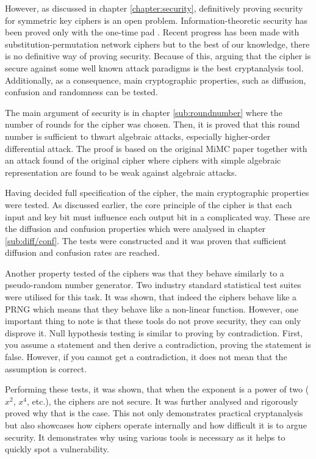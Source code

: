 \documentclass{Resources/UoBLab1}
\theoremstyle{definition}
\begin{document}
However, as discussed in chapter \ref{chapter:security}, definitively proving security for symmetric key ciphers is an open problem. Information-theoretic security has been proved only with the one-time pad \cite{OneTime}. Recent progress has been made with substitution-permutation network ciphers but to the best of our knowledge, there is no definitive way of proving security. Because of this, arguing that the cipher is secure against some well known attack paradigms is the best cryptanalysis tool. Additionally, as a consequence, main cryptographic properties, such as diffusion, confusion and randomness can be tested.

The main argument of security is in chapter \ref{sub:roundnumber} where the number of rounds for the cipher was chosen. Then, it is proved that this round number is sufficient to thwart algebraic attacks, especially higher-order differential attack. The proof is based on the original MiMC paper\cite{MiMC} together with an attack found of the original cipher\cite{MiMCAttack} where ciphers with simple algebraic representation are found to be weak against algebraic attacks.

Having decided full specification of the cipher, the main cryptographic properties were tested. As discussed earlier, the core principle of the cipher is that each input and key bit must influence each output bit in a complicated way. These are the diffusion and confusion properties which were analysed in chapter \ref{sub:diff/conf}. The tests were constructed and it was proven that sufficient diffusion and confusion rates are reached.

Another property tested of the ciphers was that they behave similarly to a pseudo-random number generator. Two industry standard statistical test suites were utilised for this task. It was shown, that indeed the ciphers behave like a PRNG which means that they behave like a non-linear function. However, one important thing to note is that these tools do not prove security, they can only disprove it. Null hypothesis testing is similar to proving by contradiction. First, you assume a statement and then derive a contradiction, proving the statement is false. However, if you cannot get a contradiction, it does not mean that the assumption is correct.

Performing these tests, it was shown, that when the exponent is a power of two ($x^2$, $x^4$, etc.), the ciphers are not secure. It was further analysed and rigorously proved why that is the case. This not only demonstrates practical cryptanalysis but also showcases how ciphers operate internally and how difficult it is to argue security. It demonstrates why using various tools is necessary as it helps to quickly spot a vulnerability.
\end{document}
